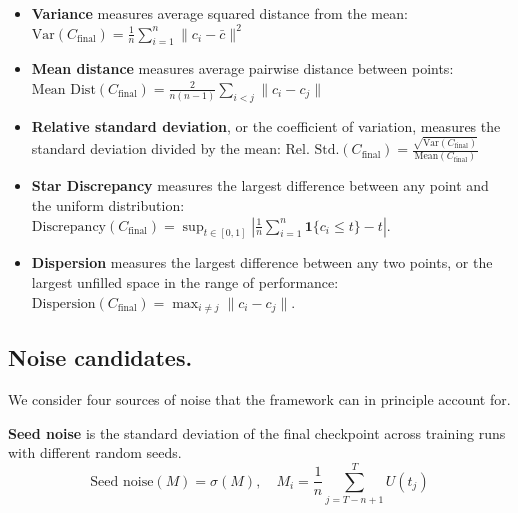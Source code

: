 \begin{itemize}[leftmargin=15pt,noitemsep,topsep=0pt]
    \item \textbf{Variance} measures average squared distance from the mean: $\text{Var}(C_\text{final}) = \frac{1}{n} \sum_{i=1}^{n} \|c_i - \bar{c}\|^2$
    \item \textbf{Mean distance} measures average pairwise distance between points: $\text{Mean Dist}(C_\text{final}) = \frac{2}{n(n-1)} \sum_{i < j} \|c_i - c_j\|$
    \item \textbf{Relative standard deviation}, or the coefficient of variation, measures the standard deviation divided by the mean: $\text{Rel. Std.}(C_\text{final}) = \frac{\sqrt{\text{Var}(C_\text{final})}}{\text{Mean}(C_\text{final})}$
    \item \textbf{Star Discrepancy} measures the largest difference between any point and the uniform distribution: $\text{Discrepancy}(C_\text{final}) = \sup_{t \in [0,1]} \left| \frac{1}{n} \sum_{i=1}^n \mathbf{1}\{c_i \leq t\} - t \right|$. 
    \item \textbf{Dispersion} measures the largest difference between any two points, or the largest unfilled space in the range of performance: $\text{Dispersion}(C_\text{final}) = \max_{i \neq j} \|c_i - c_j\|$. 
\end{itemize}


\subsection{Noise candidates.}
\label{app:measuring-noise}

We consider four sources of noise that the framework can in principle account for.


\textbf{Seed noise} is the standard deviation of the final checkpoint across training runs with different random seeds.
\begin{equation}
 \text{Seed noise}(M) = \sigma(M),\quad M_i = \textstyle\frac{1}{n} \sum_{j=T-n+1}^{T} U(t_j)
\end{equation}

